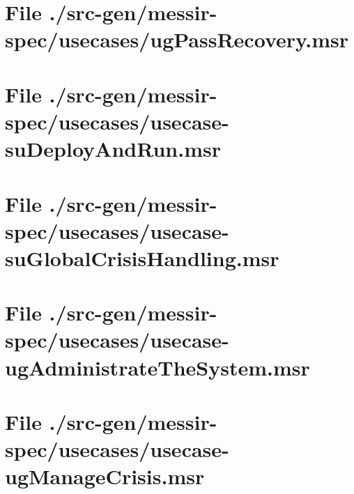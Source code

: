 \section[File /src-gen/messir-spec/usecases/ugPassRecovery.msr]{File ./src-gen/messir-spec/usecases/ugPassRecovery.msr}
\scriptsize

\normalsize
	
\section[File /src-gen/messir-spec/usecases/usecase-suDeployAndRun.msr]{File ./src-gen/messir-spec/usecases/usecase-suDeployAndRun.msr}
\scriptsize

\normalsize
	
\section[File /src-gen/messir-spec/usecases/usecase-suGlobalCrisisHandling.msr]{File ./src-gen/messir-spec/usecases/usecase-suGlobalCrisisHandling.msr}
\scriptsize

\normalsize
	
\section[File /src-gen/messir-spec/usecases/usecase-ugAdministrateTheSystem.msr]{File ./src-gen/messir-spec/usecases/usecase-ugAdministrateTheSystem.msr}
\scriptsize

\normalsize
	
\section[File /src-gen/messir-spec/usecases/usecase-ugManageCrisis.msr]{File ./src-gen/messir-spec/usecases/usecase-ugManageCrisis.msr}
\scriptsize

\normalsize
	
